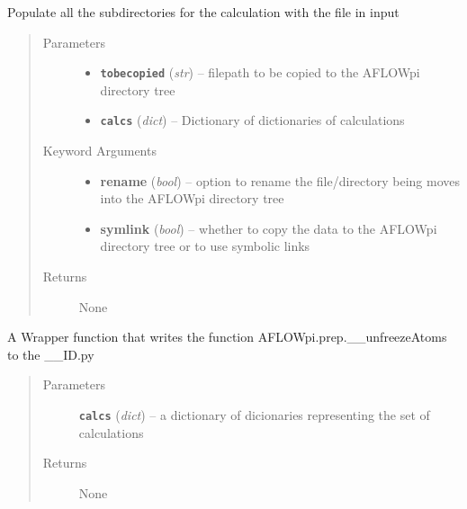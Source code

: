 \documentclass[letterpaper,10pt,english]{sphinxmanual}
\begin{document}
\begin{fulllineitems}
\label{prep:prep.totree}
Populate all the subdirectories for the calculation with the file in input
\begin{quote}\begin{description}
\item[{Parameters}] \leavevmode\begin{itemize}
\item {} 
\textbf{\texttt{tobecopied}} (\emph{str}) -- filepath to be copied to the AFLOWpi directory tree

\item {} 
\textbf{\texttt{calcs}} (\emph{dict}) -- Dictionary of dictionaries of calculations

\end{itemize}

\item[{Keyword Arguments}] \leavevmode\begin{itemize}
\item {} 
\textbf{rename} (\emph{bool}) --
option to rename the file/directory being moves into the AFLOWpi
directory tree

\item {} 
\textbf{symlink} (\emph{bool}) --
whether to copy the data to the AFLOWpi directory tree or
to use symbolic links

\end{itemize}

\item[{Returns}] \leavevmode
None

\end{description}\end{quote}

\end{fulllineitems}


\begin{fulllineitems}
\label{prep:prep.unlockAtomMovement}
A Wrapper function that writes the function AFLOWpi.prep.\_\_unfreezeAtoms to the \_\_ID.py
\begin{quote}\begin{description}
\item[{Parameters}] \leavevmode
\textbf{\texttt{calcs}} (\emph{dict}) -- a dictionary of dicionaries representing the set of calculations

\item[{Returns}] \leavevmode
None

\end{description}\end{quote}

\end{fulllineitems}
\end{document}
